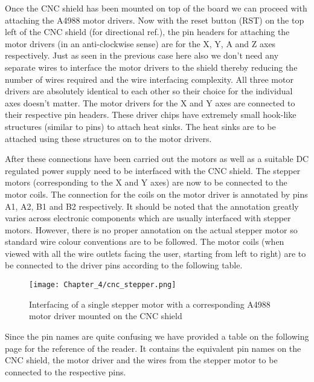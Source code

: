 Once the CNC shield has been mounted on top of the board we can proceed with attaching the A4988 motor drivers. Now with the reset button (RST) on the top left of the CNC shield (for directional ref.), the pin headers for attaching the motor drivers (in an anti-clockwise sense) are for the X, Y, A and Z axes respectively. Just as seen in the previous case here also we don’t need any separate wires to interface the motor drivers to the shield thereby reducing the number of wires required and the wire interfacing complexity. All three motor drivers are absolutely identical to each other so their choice for the individual axes doesn’t matter. The motor drivers for the X and Y axes are connected to their respective pin headers. These driver chips have extremely small hook-like structures (similar to pins) to attach heat sinks. The heat sinks are to be attached using these structures on to the motor drivers. \par

After these connections have been carried out the motors as well as a suitable DC regulated power supply need to be interfaced with the CNC shield. The stepper motors (corresponding to the X and Y axes) are now to be connected to the motor coils. The connection for the coils on the motor driver is annotated by pins A1, A2, B1 and B2 respectively. It should be noted that the annotation greatly varies across electronic components which are usually interfaced with stepper motors. However, there is no proper annotation on the actual stepper motor so standard wire colour conventions are to be followed. The motor coils (when viewed with all the wire outlets facing the user, starting from left to right) are to be connected to the driver pins according to the following table. \par

\begin{figure}[h]
 \centering
 \texttt{[image: Chapter\_4/cnc\_stepper.png]}
 \caption{Interfacing of a single stepper motor with a corresponding A4988 motor driver mounted on the CNC shield}
 \label{fig:cnc_stepper}
\end{figure}


Since the pin names are quite confusing we have provided a table on the following page for the reference of the reader. It contains the equivalent pin names on the CNC shield, the motor driver and the wires from the stepper motor to be connected to the respective pins. \pagebreak

